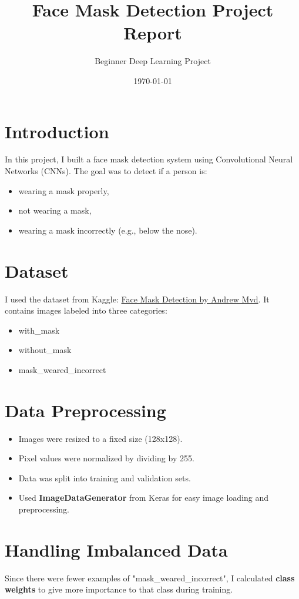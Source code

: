 \documentclass[12pt]{article}
\title{Face Mask Detection Project Report}
\author{Beginner Deep Learning Project}
\date{\today}
\begin{document}
\maketitle

\section*{Introduction}
In this project, I built a face mask detection system using Convolutional Neural Networks (CNNs). The goal was to detect if a person is:
\begin{itemize}
    \item wearing a mask properly,
    \item not wearing a mask,
    \item wearing a mask incorrectly (e.g., below the nose).
\end{itemize}

\section*{Dataset}
I used the dataset from Kaggle: \href{https://www.kaggle.com/datasets/andrewmvd/face-mask-detection}{Face Mask Detection by Andrew Mvd}. It contains images labeled into three categories:
\begin{itemize}
    \item with\_mask
    \item without\_mask
    \item mask\_weared\_incorrect
\end{itemize}

\section*{Data Preprocessing}
\begin{itemize}
    \item Images were resized to a fixed size (128x128).
    \item Pixel values were normalized by dividing by 255.
    \item Data was split into training and validation sets.
    \item Used \textbf{ImageDataGenerator} from Keras for easy image loading and preprocessing.
\end{itemize}

\section*{Handling Imbalanced Data}
Since there were fewer examples of "mask\_weared\_incorrect", I calculated \textbf{class weights} to give more importance to that class during training.
\end{document}
